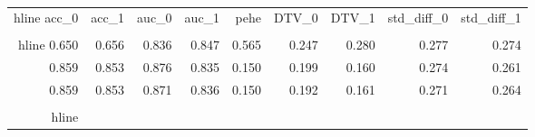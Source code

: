 \begin{table}[h]
\centering
\caption{}
\label{wd_para_6.0_wd_273.0181579589844}
\begin{tabular}{rrrrrrrrr}
\\hline
 acc\_0 &  acc\_1 &  auc\_0 &  auc\_1 &  pehe &  DTV\_0 &  DTV\_1 &  std\_diff\_0 &  std\_diff\_1 \\
\\hline
 0.650 &  0.656 &  0.836 &  0.847 & 0.565 &  0.247 &  0.280 &       0.277 &       0.274 \\
 0.859 &  0.853 &  0.876 &  0.835 & 0.150 &  0.199 &  0.160 &       0.274 &       0.261 \\
 0.859 &  0.853 &  0.871 &  0.836 & 0.150 &  0.192 &  0.161 &       0.271 &       0.264 \\
\\hline
\end{tabular}
\end{table}
